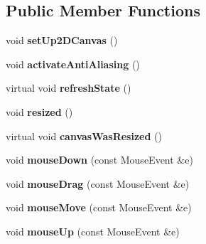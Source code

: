 \subsection*{Public Member Functions}
\begin{DoxyCompactItemize}
\item 
\hypertarget{classOpenGLCanvas_a4e5465af99da8ef948080780056e123e}{void {\bfseries set\-Up2\-D\-Canvas} ()}\label{classOpenGLCanvas_a4e5465af99da8ef948080780056e123e}

\item 
\hypertarget{classOpenGLCanvas_a4ce8932a473332c5c651f4f1cd0e0011}{void {\bfseries activate\-Anti\-Aliasing} ()}\label{classOpenGLCanvas_a4ce8932a473332c5c651f4f1cd0e0011}

\item 
\hypertarget{classOpenGLCanvas_adcedeaa60cb0e63d9d595789833c39e3}{virtual void {\bfseries refresh\-State} ()}\label{classOpenGLCanvas_adcedeaa60cb0e63d9d595789833c39e3}

\item 
\hypertarget{classOpenGLCanvas_ae84b5f2f607282735c772d2ceb7a3216}{void {\bfseries resized} ()}\label{classOpenGLCanvas_ae84b5f2f607282735c772d2ceb7a3216}

\item 
\hypertarget{classOpenGLCanvas_a185d4885860a66db22099d44b1e610ed}{virtual void {\bfseries canvas\-Was\-Resized} ()}\label{classOpenGLCanvas_a185d4885860a66db22099d44b1e610ed}

\item 
\hypertarget{classOpenGLCanvas_ac99c34fbaef2b2a045aaf9e494f3bee6}{void {\bfseries mouse\-Down} (const Mouse\-Event \&e)}\label{classOpenGLCanvas_ac99c34fbaef2b2a045aaf9e494f3bee6}

\item 
\hypertarget{classOpenGLCanvas_ac151422c650b9b8fffdd8d046d2721d3}{void {\bfseries mouse\-Drag} (const Mouse\-Event \&e)}\label{classOpenGLCanvas_ac151422c650b9b8fffdd8d046d2721d3}

\item 
\hypertarget{classOpenGLCanvas_a2da895f0e19af911ffce8d8f6ddaecd9}{void {\bfseries mouse\-Move} (const Mouse\-Event \&e)}\label{classOpenGLCanvas_a2da895f0e19af911ffce8d8f6ddaecd9}

\item 
\hypertarget{classOpenGLCanvas_a851ff2424c5b506b0e0f6c7e267fd64a}{void {\bfseries mouse\-Up} (const Mouse\-Event \&e)}\label{classOpenGLCanvas_a851ff2424c5b506b0e0f6c7e267fd64a}


\end{DoxyCompactItemize}
